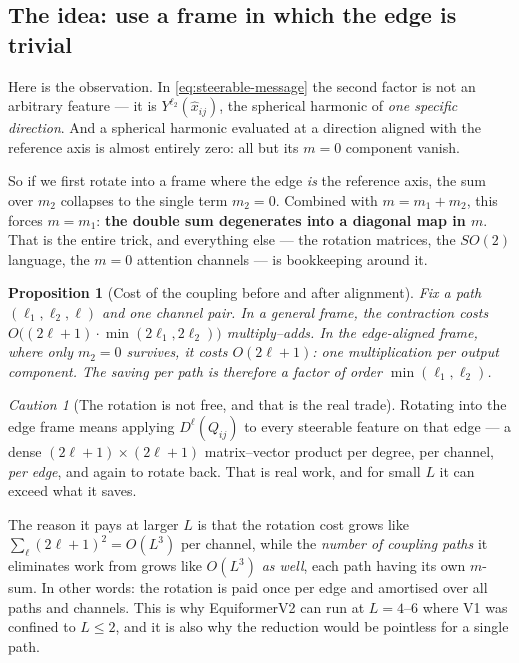 \documentclass[11pt,a4paper]{report}
\newtheorem{proposition}[proposition]{Proposition}
\theoremstyle{definition}
\theoremstyle{remark}
\newtheorem{caution}[caution]{Caution}
\begin{document}
\subsection{The idea: use a frame in which the edge is trivial}

Here is the observation. In \eqref{eq:steerable-message} the second factor is
not an arbitrary feature --- it is $Y^{\ell_2}(\hat x_{ij})$, the spherical
harmonic of \emph{one specific direction}. And a spherical harmonic evaluated
at a direction aligned with the reference axis is almost entirely zero:
all but its $m=0$ component vanish.

So if we first rotate into a frame where the edge \emph{is} the reference
axis, the sum over $m_2$ collapses to the single term $m_2=0$. Combined with
$m=m_1+m_2$, this forces $m=m_1$: \textbf{the double sum degenerates into a
diagonal map in $m$}. That is the entire trick, and everything else --- the
rotation matrices, the $SO(2)$ language, the $m=0$ attention channels --- is
bookkeeping around it.

\begin{proposition}[Cost of the coupling before and after alignment]
\label{prop:so2-cost}
Fix a path $(\ell_1,\ell_2,\ell)$ and one channel pair. In a general frame,
the contraction costs $O\bigl((2\ell+1)\cdot\min(2\ell_1,2\ell_2)\bigr)$
multiply--adds. In the edge-aligned frame, where only $m_2=0$ survives, it
costs $O(2\ell+1)$: one multiplication per output component. The saving per
path is therefore a factor of order $\min(\ell_1,\ell_2)$.
\end{proposition}

\begin{caution}[The rotation is not free, and that is the real trade]
\label{caution:so2-tradeoff}
Rotating into the edge frame means applying $D^\ell(Q_{ij})$ to every
steerable feature on that edge --- a dense $(2\ell+1)\times(2\ell+1)$
matrix--vector product per degree, per channel, \emph{per edge}, and again to
rotate back. That is real work, and for small $L$ it can exceed what it
saves.

The reason it pays at larger $L$ is that the rotation cost grows like
$\sum_\ell(2\ell+1)^2=O(L^3)$ per channel, while the \emph{number of
coupling paths} it eliminates work from grows like $O(L^3)$ \emph{as well},
each path having its own $m$-sum. In other words: the rotation is paid once
per edge and amortised over all paths and channels. This is why
EquiformerV2 can run at $L=4$--$6$ where V1 was confined to $L\le2$, and it
is also why the reduction would be pointless for a single path.
\end{caution}
\end{document}
